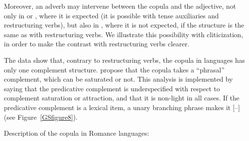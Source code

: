 Moreover, an adverb may intervene between the copula and the adjective, not only in  or , where it is expected (it is possible with tense auxiliaries and restructuring verbs), but also in , where it is not expected, if the structure is the same as with restructuring verbs. We illustrate this possibility with cliticization, in order to make the contrast with restructuring verbs clearer.

\eal
	\label{GSexemple34} 
	\label{GSexemple34a}

	\label{GSexemple34b}
		
	\label{GSexemple34c}
\zl

\noindent
The data show that, contrary to restructuring verbs, the copula in  languages has only
one complement structure. \citet{AG2002b-u,AG2010} propose that the copula takes a ``phrasal''
complement, which can be saturated or not. This analysis is implemented by saying that the
predicative complement is underspecified with respect to complement saturation or attraction, and
that it is non-light in all cases. If the predicative complement is a lexical item, a unary
branching phrase makes it [\light{}$–$] (see Figure~\ref{GSfigure8}).

\eas
Description of the copula in Romance languages: \\
\label{GSexemple35}
\zs

